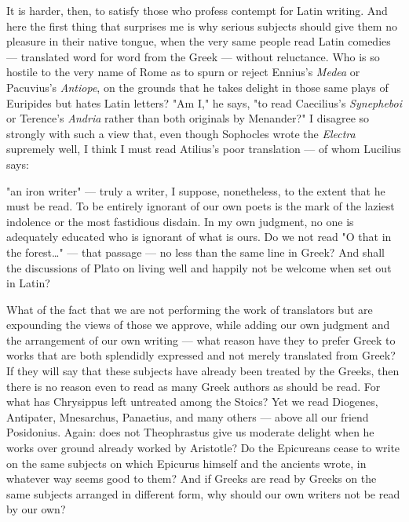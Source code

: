  It is harder, then, to satisfy those who profess contempt for Latin writing. And here the first thing that surprises me is why serious subjects should give them no pleasure in their native tongue, when the very same people read Latin comedies — translated word for word from the Greek — without reluctance. Who is so hostile to the very name of Rome as to spurn or reject Ennius's \textit{Medea} or Pacuvius's \textit{Antiope}, on the grounds that he takes delight in those same plays of Euripides but hates Latin letters? "Am I," he says, "to read Caecilius's \textit{Synepheboi} or Terence's \textit{Andria} rather than both originals by Menander?" I disagree so strongly with such a view that, even though Sophocles wrote the \textit{Electra} supremely well, I think I must read Atilius's poor translation — of whom Lucilius says:

 "an iron writer" — truly a writer, I suppose, nonetheless, to the extent that he must be read. To be entirely ignorant of our own poets is the mark of the laziest indolence or the most fastidious disdain. In my own judgment, no one is adequately educated who is ignorant of what is ours. Do we not read "O that in the forest…" — that passage — no less than the same line in Greek? And shall the discussions of Plato on living well and happily not be welcome when set out in Latin?

 What of the fact that we are not performing the work of translators but are expounding the views of those we approve, while adding our own judgment and the arrangement of our own writing — what reason have they to prefer Greek to works that are both splendidly expressed and not merely translated from Greek? If they will say that these subjects have already been treated by the Greeks, then there is no reason even to read as many Greek authors as should be read. For what has Chrysippus left untreated among the Stoics? Yet we read Diogenes, Antipater, Mnesarchus, Panaetius, and many others — above all our friend Posidonius. Again: does not Theophrastus give us moderate delight when he works over ground already worked by Aristotle? Do the Epicureans cease to write on the same subjects on which Epicurus himself and the ancients wrote, in whatever way seems good to them? And if Greeks are read by Greeks on the same subjects arranged in different form, why should our own writers not be read by our own?

